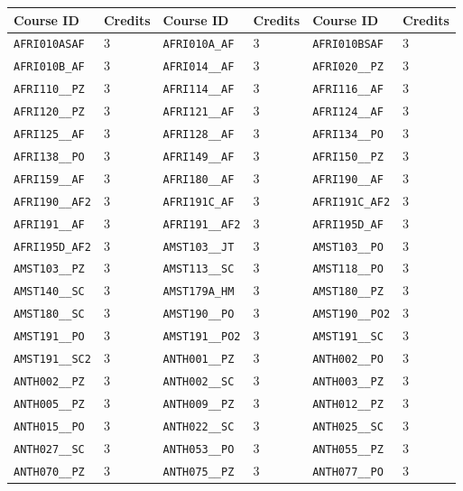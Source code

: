 \begin{longtable}{|l|l||l|l||l|l|}
    \hline
    Course ID & Credits & Course ID & Credits & Course ID & Credits\\\hline
    \verb|AFRI010ASAF| & 3 & \verb|AFRI010A_AF| & 3 & \verb|AFRI010BSAF| & 3\\\hline
    \verb|AFRI010B_AF| & 3 & \verb|AFRI014__AF| & 3 & \verb|AFRI020__PZ| & 3\\\hline
    \verb|AFRI110__PZ| & 3 & \verb|AFRI114__AF| & 3 & \verb|AFRI116__AF| & 3\\\hline
    \verb|AFRI120__PZ| & 3 & \verb|AFRI121__AF| & 3 & \verb|AFRI124__AF| & 3\\\hline
    \verb|AFRI125__AF| & 3 & \verb|AFRI128__AF| & 3 & \verb|AFRI134__PO| & 3\\\hline
    \verb|AFRI138__PO| & 3 & \verb|AFRI149__AF| & 3 & \verb|AFRI150__PZ| & 3\\\hline
    \verb|AFRI159__AF| & 3 & \verb|AFRI180__AF| & 3 & \verb|AFRI190__AF| & 3\\\hline
    \verb|AFRI190__AF2| & 3 & \verb|AFRI191C_AF| & 3 & \verb|AFRI191C_AF2| & 3\\\hline
    \verb|AFRI191__AF| & 3 & \verb|AFRI191__AF2| & 3 & \verb|AFRI195D_AF| & 3\\\hline
    \verb|AFRI195D_AF2| & 3 & \verb|AMST103__JT| & 3 & \verb|AMST103__PO| & 3\\\hline
    \verb|AMST103__PZ| & 3 & \verb|AMST113__SC| & 3 & \verb|AMST118__PO| & 3\\\hline
    \verb|AMST140__SC| & 3 & \verb|AMST179A_HM| & 3 & \verb|AMST180__PZ| & 3\\\hline
    \verb|AMST180__SC| & 3 & \verb|AMST190__PO| & 3 & \verb|AMST190__PO2| & 3\\\hline
    \verb|AMST191__PO| & 3 & \verb|AMST191__PO2| & 3 & \verb|AMST191__SC| & 3\\\hline
    \verb|AMST191__SC2| & 3 & \verb|ANTH001__PZ| & 3 & \verb|ANTH002__PO| & 3\\\hline
    \verb|ANTH002__PZ| & 3 & \verb|ANTH002__SC| & 3 & \verb|ANTH003__PZ| & 3\\\hline
    \verb|ANTH005__PZ| & 3 & \verb|ANTH009__PZ| & 3 & \verb|ANTH012__PZ| & 3\\\hline
    \verb|ANTH015__PO| & 3 & \verb|ANTH022__SC| & 3 & \verb|ANTH025__SC| & 3\\\hline
    \verb|ANTH027__SC| & 3 & \verb|ANTH053__PO| & 3 & \verb|ANTH055__PZ| & 3\\\hline
    \verb|ANTH070__PZ| & 3 & \verb|ANTH075__PZ| & 3 & \verb|ANTH077__PO| & 3\\\hline

\end{longtable}
